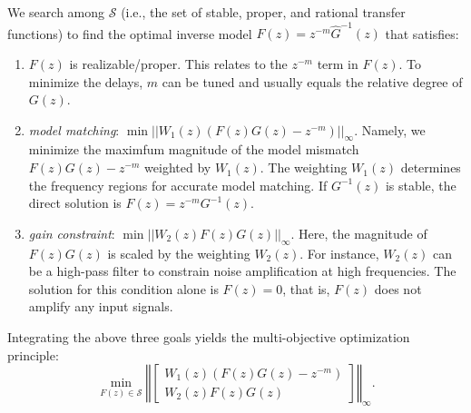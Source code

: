 \documentclass [11pt, proquest] {uwthesis}[2020/02/24]
\begin{document}
We search among $\mathcal{S}$ (i.e., the set of stable, proper, and rational transfer functions) to
find the optimal inverse model $F(z)=z^{-m}\hat{G}^{-1}(z)$ that
satisfies:
\begin{enumerate}
\item $F(z)$ is realizable/proper. This relates to the $z^{-m}$ term in
$F(z)$. To minimize the delays, $m$ can be tuned and usually equals
the relative degree of $G(z)$.
\item \emph{model matching}: $\min||W_{1}(z)(F(z)G(z)-z^{-m})||_{\infty}$.
Namely, we minimize the maximfum magnitude of the model mismatch $F(z)G(z)-z^{-m}$
weighted by $W_{1}(z)$. The weighting $W_{1}(z)$ determines the
frequency regions for accurate model matching. If $G^{-1}(z)$ is
stable, the direct solution is $F(z)=z^{-m}G^{-1}(z)$. 
\item \emph{gain constraint}: $\min||W_{2}(z)F(z)G(z)||_{\infty}$. Here,
the magnitude of $F(z)G(z)$ is scaled by the weighting $W_{2}(z)$.
For instance, $W_{2}(z)$ can be a high-pass filter to constrain noise
amplification at high frequencies. The solution for this condition
alone is $F(z)=0$, that is, $F(z)$ does not amplify any input signals. 
\end{enumerate}
Integrating the above three goals yields the multi-objective optimization
principle:
\begin{equation}
\min_{F(z)\in\mathcal{S}}\left\Vert \left[\begin{array}{c}
W_{1}(z)(F(z)G(z)-z^{-m})\\
W_{2}(z)F(z)G(z)
\end{array}\right]\right\Vert _{\infty}.\label{eq:hinf-2}
\end{equation}
\end{document}
